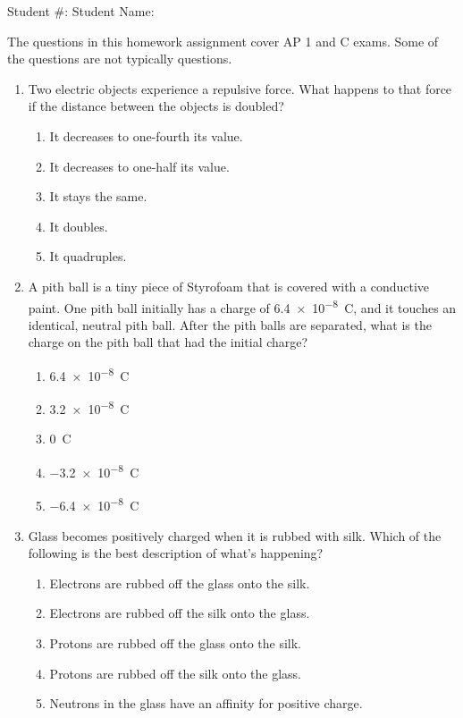 \documentclass[12pt]{article}
\begin{document}
\begin{center}
  Student \#: \underline{\hspace{1in}}\hspace{1.9in}
  Student Name: \underline{\hspace{2in}}\\
  \vspace{0.3in}{\LARGE
    AP Physics Class 10 \& 11: Electrostatics \& Gauss's Law}
\end{center}

The questions in this homework assignment cover AP 1 and C exams. Some of the
questions are not typically questions.

\begin{enumerate}[leftmargin=50pt,label=\underline{\hspace{0.4in}} \arabic*.]


\item Two electric objects experience a repulsive force. What happens to that
  force if the distance between the objects is doubled?
  \begin{enumerate}[noitemsep,topsep=0pt,leftmargin=18pt]
  \item It decreases to one-fourth its value.
  \item It decreases to one-half its value.
  \item It stays the same.
  \item It doubles.
  \item It quadruples.
  \end{enumerate}

\item A pith ball is a tiny piece of Styrofoam that is covered with a
  conductive paint. One pith ball initially has a charge of \SI{6.4e-8}{C},
  and it touches an identical, neutral pith ball. After the pith balls are
  separated, what is the charge on the pith ball that had the initial charge?
  \begin{enumerate}[noitemsep,topsep=0pt,leftmargin=18pt]
  \item\SI{6.4e-8}{C}
  \item\SI{3.2e-8}{C}
  \item\SI{0}{C}
  \item\SI{-3.2e-8}{C}
  \item\SI{-6.4e-8}{C}
  \end{enumerate}

\item Glass becomes positively charged when it is rubbed with silk. Which
  of the following is the best description of what’s happening?
  \begin{enumerate}[noitemsep,topsep=0pt,leftmargin=18pt]
  \item Electrons are rubbed off the glass onto the silk.
  \item Electrons are rubbed off the silk onto the glass.
  \item Protons are rubbed off the glass onto the silk.
  \item Protons are rubbed off the silk onto the glass.
  \item Neutrons in the glass have an affinity for positive charge.
  \end{enumerate}
  

\end{enumerate}
\end{document}
